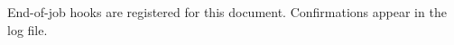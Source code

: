 \documentclass{article}
\begin{document}
End-of-job hooks are registered for this document.
Confirmations appear in the log file.
\end{document}
